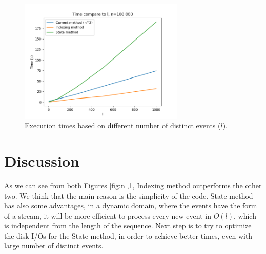 \documentclass{article}
\begin{document}
\begin{figure}[tb!]
	\centering	
	\includegraphics[width=0.7\textwidth]{time_compare_l_3.png}
	\caption{Execution times based on different number of distinct events ($l$).}
	\label{fig:l}
\end{figure}

 \section{Discussion}
 As we can see from both Figures \ref{fig:n},\ref{fig:l}, Indexing method outperforms the other two. We think that the main reason is the simplicity of the code. State method has also some advantages, in a dynamic domain, where the events have the form of a stream, it will be more efficient to process every new event in $O(l)$, which is independent from the length of the sequence. Next step is to try to optimize the disk I/Os for the State method, in order to achieve better times, even with large number of distinct events.
\end{document}
